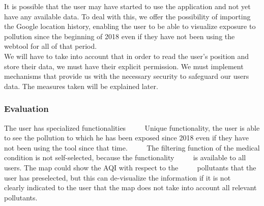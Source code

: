 It is possible that the user may have started to use the application and not yet have any available data.
To deal with this, we offer the possibility of importing the Google location history, enabling the user to be able to visualize
exposure to pollution since the beginning of 2018 even if they have not been using the webtool for  all of that period.\\

We will have to take into account that in order to read the user's position and store their data, we must
have their explicit permission. We must implement mechanisms that provide us with the necessary security to safeguard our users data. The measures taken will be explained later.

\subsubsection*{Evaluation}

\begin{itemize}
  \done The user has specialized functionalities
     \done Unique functionality, the user is able to see the pollution to which he has been exposed since 2018 even if they have not been using the tool since that time.
     \crossed The filtering function of the medical condition is not self-selected, because the functionality
     is available to all users. The map could show the AQI with respect to the
     pollutants that the user has preselected, but this can de-visualize the information if it is not
     clearly indicated to the user that the map does not take into account all relevant pollutants.
\end{itemize}
